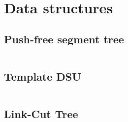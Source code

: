 \section{Data structures}

\subsection{Push-free segment tree}

\inputminted{cpp}{code/pushfreesegtree_faster.cpp}

\subsection{Template DSU}

\inputminted{cpp}{code/dsu.cpp}

\subsection{Link-Cut Tree}

\inputminted{cpp}{code/lct_short.cpp}

